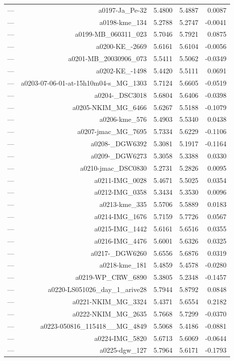 \begin{table}[htbp]
\begin{tabular}{lrrrr}
— & a0197-Ja_Pe-32 & 5.4800 & 5.4887 & 0.0087 \\
— & a0198-kme_134 & 5.2788 & 5.2747 & -0.0041 \\
— & a0199-MB_060311_023 & 5.7046 & 5.7921 & 0.0875 \\
— & a0200-KE_-2669 & 5.6161 & 5.6104 & -0.0056 \\
— & a0201-MB_20030906_073 & 5.5411 & 5.5062 & -0.0349 \\
— & a0202-KE_-1498 & 5.4420 & 5.5111 & 0.0691 \\
— & a0203-07-06-01-at-15h10m04-s_MG_1303 & 5.7124 & 5.6605 & -0.0519 \\
— & a0204-_DSC3018 & 5.6804 & 5.6406 & -0.0398 \\
— & a0205-NKIM_MG_6466 & 5.6267 & 5.5188 & -0.1079 \\
— & a0206-kme_576 & 5.4903 & 5.5340 & 0.0438 \\
— & a0207-jmac_MG_7695 & 5.7334 & 5.6229 & -0.1106 \\
— & a0208-_DGW6392 & 5.3081 & 5.1917 & -0.1164 \\
— & a0209-_DGW6273 & 5.3058 & 5.3388 & 0.0330 \\
— & a0210-jmac_DSC0830 & 5.2731 & 5.2826 & 0.0095 \\
— & a0211-IMG_0028 & 5.4671 & 5.5025 & 0.0354 \\
— & a0212-IMG_0358 & 5.3434 & 5.3530 & 0.0096 \\
— & a0213-kme_335 & 5.5706 & 5.5889 & 0.0183 \\
— & a0214-IMG_1676 & 5.7159 & 5.7726 & 0.0567 \\
— & a0215-IMG_1442 & 5.6161 & 5.6516 & 0.0355 \\
— & a0216-IMG_4476 & 5.6001 & 5.6326 & 0.0325 \\
— & a0217-_DGW6260 & 5.6556 & 5.6876 & 0.0319 \\
— & a0218-kme_181 & 5.4859 & 5.4578 & -0.0280 \\
— & a0219-WP_CRW_6890 & 5.3805 & 5.2348 & -0.1457 \\
— & a0220-LS051026_day_1_arive28 & 5.7944 & 5.8792 & 0.0848 \\
— & a0221-NKIM_MG_3324 & 5.4371 & 5.6554 & 0.2182 \\
— & a0222-NKIM_MG_2635 & 5.7668 & 5.7299 & -0.0370 \\
— & a0223-050816_115418__MG_4849 & 5.5068 & 5.4186 & -0.0881 \\
— & a0224-IMG_5820 & 5.6713 & 5.6069 & -0.0644 \\
— & a0225-dgw_127 & 5.7964 & 5.6171 & -0.1793 \\

\end{tabular}
\end{table}
